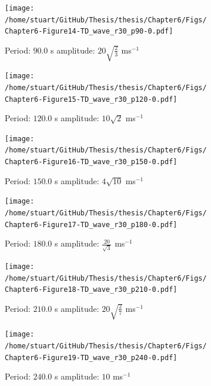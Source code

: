 \documentclass[a4paper,12pt,fourier,authoryear,custommargin]{Classes/PhDThesisPSnPDF}
\begin{document}
\begin{figure}
    \centering
\ContinuedFloat
    

    \begin{subfigure}[b]{0.79\columnwidth}
        \texttt{[image: /home/stuart/GitHub/Thesis/thesis/Chapter6/Figs/Chapter6-Figure14-TD\_wave\_r30\_p90-0.pdf]}
        \caption{Period: $90.0$ s amplitude: $20\sqrt{\frac{2}{3}}$ ms$^{{-1}}$}
        \label{fig:TD-wave-r30-p90-0}
    \end{subfigure}

    \begin{subfigure}[b]{0.79\columnwidth}
        \texttt{[image: /home/stuart/GitHub/Thesis/thesis/Chapter6/Figs/Chapter6-Figure15-TD\_wave\_r30\_p120-0.pdf]}
        \caption{Period: $120.0$ s amplitude: $10\sqrt{2}$ ms$^{{-1}}$}
        \label{fig:TD-wave-r30-p120-0}
    \end{subfigure}
    \caption{}
    \label{fig:TD-fwave-r30-c}
\end{figure}

\begin{figure}
    \centering
\ContinuedFloat
    

    \begin{subfigure}[b]{0.79\columnwidth}
        \texttt{[image: /home/stuart/GitHub/Thesis/thesis/Chapter6/Figs/Chapter6-Figure16-TD\_wave\_r30\_p150-0.pdf]}
        \caption{Period: $150.0$ s amplitude: $4\sqrt{10}$ ms$^{{-1}}$}
        \label{fig:TD-wave-r30-p150-0}
    \end{subfigure}

    \begin{subfigure}[b]{0.79\columnwidth}
        \texttt{[image: /home/stuart/GitHub/Thesis/thesis/Chapter6/Figs/Chapter6-Figure17-TD\_wave\_r30\_p180-0.pdf]}
        \caption{Period: $180.0$ s amplitude: $\frac{20}{\sqrt{3}}$ ms$^{{-1}}$}
        \label{fig:TD-wave-r30-p180-0}
    \end{subfigure}
    \caption{}
    \label{fig:TD-fwave-r30-c}
\end{figure}

\begin{figure}
    \centering
\ContinuedFloat
    

    \begin{subfigure}[b]{0.79\columnwidth}
        \texttt{[image: /home/stuart/GitHub/Thesis/thesis/Chapter6/Figs/Chapter6-Figure18-TD\_wave\_r30\_p210-0.pdf]}
        \caption{Period: $210.0$ s amplitude: $20\sqrt{\frac{2}{7}}$ ms$^{{-1}}$}
        \label{fig:TD-wave-r30-p210-0}
    \end{subfigure}

    \begin{subfigure}[b]{0.79\columnwidth}
        \texttt{[image: /home/stuart/GitHub/Thesis/thesis/Chapter6/Figs/Chapter6-Figure19-TD\_wave\_r30\_p240-0.pdf]}
        \caption{Period: $240.0$ s amplitude: $10$ ms$^{{-1}}$}
        \label{fig:TD-wave-r30-p240-0}
    \end{subfigure}
    \caption{}
    \label{fig:TD-fwave-r30-c}
\end{figure}
\end{document}
